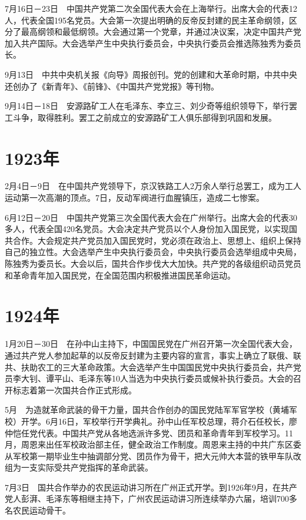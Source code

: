 \documentclass[10pt,a4paper,twocolumn]{book}
\begin{document}
7月16日－23日　中国共产党第二次全国代表大会在上海举行。出席大会的代表12人，代表全国195名党员。大会第一次提出明确的反帝反封建的民主革命纲领，区分了最高纲领和最低纲领。大会通过第一个党章，并通过决议案，决定中国共产党加入共产国际。大会选举产生中央执行委员会，中央执行委员会推选陈独秀为委员长。

9月13日　中共中央机关报《向导》周报创刊。党的创建和大革命时期，中共中央还创办了《新青年》、《前锋》、《中国共产党党报》等刊物。

9月14日－18日　安源路矿工人在毛泽东、李立三、刘少奇等组织领导下，举行罢工斗争，取得胜利。罢工之前成立的安源路矿工人俱乐部得到巩固和发展。

\section{1923年}

2月4日－9日　在中国共产党领导下，京汉铁路工人2万余人举行总罢工，成为工人运动第一次高潮的顶点。7日，反动军阀进行血腥镇压，造成二七惨案。

6月12日－20日　中国共产党第三次全国代表大会在广州举行。出席大会的代表30多人，代表全国420名党员。大会决定共产党员以个人身份加入国民党，以实现国共合作。大会规定共产党员加入国民党时，党必须在政治上、思想上、组织上保持自己的独立性。大会选举产生中央执行委员会，中央执行委员会选举组成中央局，陈独秀为委员长。大会以后，国共合作步伐大大加快。共产党的各级组织动员党员和革命青年加入国民党，在全国范围内积极推进国民革命运动。

\section{1924年}

1月20日－30日　在孙中山主持下，中国国民党在广州召开第一次全国代表大会，通过共产党人参加起草的以反帝反封建为主要内容的宣言，事实上确立了联俄、联共、扶助农工的三大革命政策。大会选举产生中国国民党中央执行委员会，共产党员李大钊、谭平山、毛泽东等10人当选为中央执行委员或候补执行委员。大会的召开标志着第一次国共合作正式形成。

5月　为造就革命武装的骨干力量，国共合作创办的国民党陆军军官学校（黄埔军校）开学。6月16日，军校举行开学典礼。孙中山任军校总理，蒋介石任校长，廖仲恺任党代表。中国共产党从各地选派许多党、团员和革命青年到军校学习。11月，周恩来出任军校政治部主任，健全政治工作制度。周恩来主持的中共广东区委从军校第一期毕业生中抽调部分党、团员作为骨干，把大元帅大本营的铁甲车队改组为一支实际受共产党指挥的革命武装。

7月3日　国共合作举办的农民运动讲习所在广州正式开学。到1926年9月，在共产党人彭湃、毛泽东等相继主持下，广州农民运动讲习所连续举办六届，培训700多名农民运动骨干。
\end{document}

